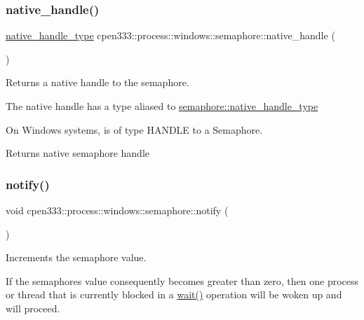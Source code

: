 \subsubsection{\texorpdfstring{native\+\_\+handle()}{native\_handle()}}
{\footnotesize\ttfamily \hyperlink{classcpen333_1_1process_1_1windows_1_1semaphore_a07f523e9a1edf0ae8afa2f21487a1953}{native\+\_\+handle\+\_\+type} cpen333\+::process\+::windows\+::semaphore\+::native\+\_\+handle (\begin{DoxyParamCaption}{ }\end{DoxyParamCaption})\hspace{0.3cm}{\ttfamily [inline]}}



Returns a native handle to the semaphore. 

The native handle has a type aliased to \hyperlink{classcpen333_1_1process_1_1windows_1_1semaphore_a07f523e9a1edf0ae8afa2f21487a1953}{semaphore\+::native\+\_\+handle\+\_\+type}

On Windows systems, is of type H\+A\+N\+D\+LE to a Semaphore.

\begin{DoxyReturn}{Returns}
native semaphore handle 
\end{DoxyReturn}
\mbox{\label{classcpen333_1_1process_1_1windows_1_1semaphore_a7f1443d55e1112e7b2a15334bafc958b}} 
\subsubsection{\texorpdfstring{notify()}{notify()}}
{\footnotesize\ttfamily void cpen333\+::process\+::windows\+::semaphore\+::notify (\begin{DoxyParamCaption}{ }\end{DoxyParamCaption})\hspace{0.3cm}{\ttfamily [inline]}}



Increments the semaphore value. 

If the semaphore\textquotesingle{}s value consequently becomes greater than zero, then one process or thread that is currently blocked in a \hyperlink{classcpen333_1_1process_1_1windows_1_1semaphore_a523d89b784ed47ade79d4ecf836f042d}{wait()} operation will be woken up and will proceed. \mbox{\label{classcpen333_1_1process_1_1windows_1_1semaphore_a06cffd6c2ed120af0477252fb48b0346}} 
